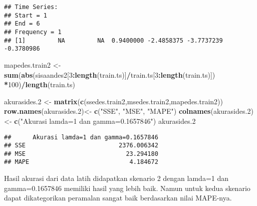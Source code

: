 \documentclass[
]{article}
\newenvironment{Shaded}{\begin{snugshade}}{\end{snugshade}}
\newcommand{\DecValTok}[1]{\textcolor[rgb]{0.00,0.00,0.81}{#1}}
\newcommand{\FloatTok}[1]{\textcolor[rgb]{0.00,0.00,0.81}{#1}}
\newcommand{\FunctionTok}[1]{\textcolor[rgb]{0.13,0.29,0.53}{\textbf{#1}}}
\newcommand{\NormalTok}[1]{#1}
\newcommand{\OtherTok}[1]{\textcolor[rgb]{0.56,0.35,0.01}{#1}}
\newcommand{\SpecialCharTok}[1]{\textcolor[rgb]{0.81,0.36,0.00}{\textbf{#1}}}
\newcommand{\StringTok}[1]{\textcolor[rgb]{0.31,0.60,0.02}{#1}}
\begin{document}
\begin{verbatim}
## Time Series:
## Start = 1 
## End = 6 
## Frequency = 1 
## [1]         NA         NA  0.9400000 -2.4858375 -3.7737239 -0.3780986
\end{verbatim}

\begin{Shaded}
\begin{Highlighting}[]
\NormalTok{mapedes.train2 }\OtherTok{\textless{}{-}} \FunctionTok{sum}\NormalTok{(}\FunctionTok{abs}\NormalTok{(sisaandes2[}\DecValTok{3}\SpecialCharTok{:}\FunctionTok{length}\NormalTok{(train.ts)]}\SpecialCharTok{/}\NormalTok{train.ts[}\DecValTok{3}\SpecialCharTok{:}\FunctionTok{length}\NormalTok{(train.ts)])}
                      \SpecialCharTok{*}\DecValTok{100}\NormalTok{)}\SpecialCharTok{/}\FunctionTok{length}\NormalTok{(train.ts)}

\NormalTok{akurasides}\FloatTok{.2} \OtherTok{\textless{}{-}} \FunctionTok{matrix}\NormalTok{(}\FunctionTok{c}\NormalTok{(ssedes.train2,msedes.train2,mapedes.train2))}
\FunctionTok{row.names}\NormalTok{(akurasides}\FloatTok{.2}\NormalTok{)}\OtherTok{\textless{}{-}} \FunctionTok{c}\NormalTok{(}\StringTok{"SSE"}\NormalTok{, }\StringTok{"MSE"}\NormalTok{, }\StringTok{"MAPE"}\NormalTok{)}
\FunctionTok{colnames}\NormalTok{(akurasides}\FloatTok{.2}\NormalTok{) }\OtherTok{\textless{}{-}} \FunctionTok{c}\NormalTok{(}\StringTok{"Akurasi lamda=1 dan gamma=0.1657846"}\NormalTok{)}
\NormalTok{akurasides}\FloatTok{.2}
\end{Highlighting}
\end{Shaded}

\begin{verbatim}
##      Akurasi lamda=1 dan gamma=0.1657846
## SSE                          2376.006342
## MSE                            23.294180
## MAPE                            4.184672
\end{verbatim}

Hasil akurasi dari data latih didapatkan skenario 2 dengan lamda=1 dan
gamma=0.1657846 memiliki hasil yang lebih baik. Namun untuk kedua
skenario dapat dikategorikan peramalan sangat baik berdasarkan nilai
MAPE-nya.
\end{document}
